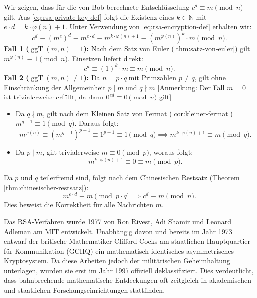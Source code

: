 \begin{math-stroke}
\begin{short-proof}
Wir zeigen, dass für die von Bob berechnete Entschlüsselung $c^d \equiv m \pmod n$ gilt.
Aus \eqref{eq:rsa-private-key-def} folgt die Existenz eines $k \in \mathbb{N}$ mit $e \cdot d = k \cdot \varphi(n) + 1$. Unter Verwendung von \eqref{eq:rsa-encryption-def} erhalten wir:
\[
c^d \equiv (m^e)^d \equiv m^{e \cdot d} \equiv m^{k \cdot \varphi(n) + 1} \equiv (m^{\varphi(n)})^k \cdot m \pmod n.
\]
\textbf{Fall 1 ($\operatorname{ggT}(m, n) = 1$):}
Nach dem Satz von Euler (\cref{thm:satz-von-euler}) gilt $m^{\varphi(n)} \equiv 1 \pmod n$. Einsetzen liefert direkt:
\[
c^d \equiv (1)^k \cdot m \equiv m \pmod n.
\]
\textbf{Fall 2 ($\operatorname{ggT}(m, n) \neq 1$):}
Da $n = p \cdot q$ mit Primzahlen $p \neq q$, gilt ohne Einschränkung der Allgemeinheit $p \mid m$ und $q \nmid m$ [Anmerkung: Der Fall $m=0$ ist trivialerweise erfüllt, da dann $0^{ed} \equiv 0 \pmod n$ gilt].
\begin{itemize}
    \item Da $q \nmid m$, gilt nach dem Kleinen Satz von Fermat (\cref{cor:kleiner-fermat}) $m^{q-1} \equiv 1 \pmod q$. Daraus folgt:
    \[
    m^{\varphi(n)} \equiv (m^{q-1})^{p-1} \equiv 1^{p-1} \equiv 1 \pmod q \implies m^{k \cdot \varphi(n) + 1} \equiv m \pmod q.
    \]
    \item Da $p \mid m$, gilt trivialerweise $m \equiv 0 \pmod p$, woraus folgt:
    \[
    m^{k \cdot \varphi(n) + 1} \equiv 0 \equiv m \pmod p.
    \]
\end{itemize}
Da $p$ und $q$ teilerfremd sind, folgt nach dem Chinesischen Restsatz (Theorem \ref{thm:chinesischer-restsatz}):
\[
m^{e \cdot d} \equiv m \pmod{p \cdot q} \implies c^d \equiv m \pmod n.
\]
Dies beweist die Korrektheit für alle Nachrichten $m$.
\end{short-proof}
\end{math-stroke}

\begin{didactic-insight}
Das RSA-Verfahren wurde 1977 von Ron Rivest, Adi Shamir und Leonard Adleman am MIT entwickelt. Unabhängig davon und bereits im Jahr 1973 entwarf der britische Mathematiker Clifford Cocks am staatlichen Hauptquartier für Kommunikation (GCHQ) ein mathematisch identisches asymmetrisches Kryptosystem. Da diese Arbeiten jedoch der militärischen Geheimhaltung unterlagen, wurden sie erst im Jahr 1997 offiziell deklassifiziert. Dies verdeutlicht, dass bahnbrechende mathematische Entdeckungen oft zeitgleich in akademischen und staatlichen Forschungseinrichtungen stattfinden.
\end{didactic-insight}

